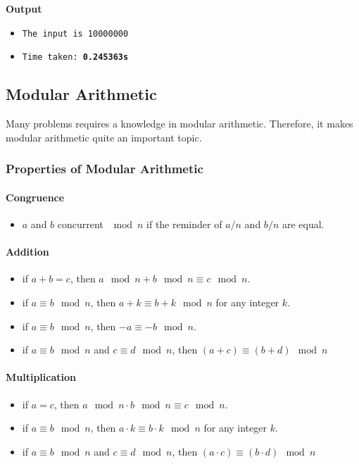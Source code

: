 \documentclass[12pt]{article}
\begin{document}
\clearpage
\textbf{Output}
\begin{itemize}
  \item \texttt{The input is 10000000} 
  \item \texttt{Time taken: \textbf{0.245363s}} 
\end{itemize}
\subsection{Modular Arithmetic}
Many problems requires a knowledge in modular arithmetic. Therefore, it makes modular arithmetic quite an important topic. 

\subsubsection{Properties of Modular Arithmetic}
\paragraph{\textbf{Congruence}}
\begin{itemize}
  \item $a$ and $b$ concurrent $\mod{n}$ if the reminder of $a/n$ and $b/n$ are equal.
\end{itemize}
\paragraph{\textbf{Addition}}
\begin{itemize}
  \item if $a + b = c$, then $a \mod{n} + b \mod{n} \equiv c \mod{n}$.
  \item if $a \equiv b \mod{n}$, then $a + k \equiv b + k \mod{n}$ for any integer $k$.
  \item if $a \equiv b \mod{n}$, then $-a \equiv -b \mod{n}$.
  \item if $a \equiv b \mod{n}$ and $c \equiv d \mod{n}$, then $(a + c) \equiv (b + d) \mod{n}$
\end{itemize}
\paragraph{\textbf{Multiplication}}
\begin{itemize}
  \item if $a = c$, then $a \mod{n} \cdot b \mod{n} \equiv c \mod{n}$.
  \item if $a \equiv b \mod{n}$, then $a \cdot k \equiv b \cdot k \mod{n}$ for any integer $k$.
  \item if $a \equiv b \mod{n}$ and $c \equiv d \mod{n}$, then $(a \cdot c) \equiv (b \cdot d) \mod{n}$
\end{itemize}
\end{document}

